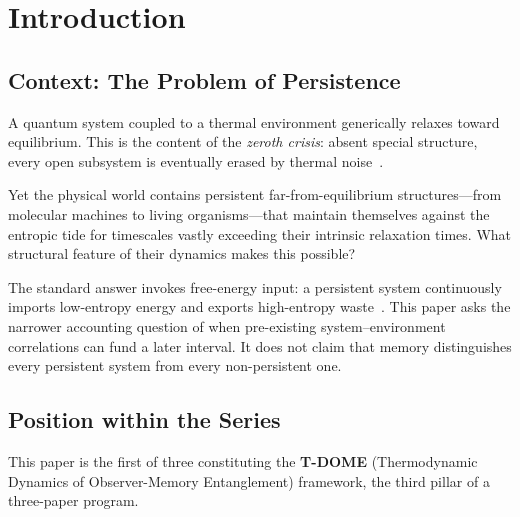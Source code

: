 \documentclass[12pt]{article}
\begin{document}
\section{Introduction}
\label{sec:intro}

\subsection{Context: The Problem of Persistence}

A quantum system coupled to a thermal environment generically
relaxes toward equilibrium. This is the content of the
\emph{zeroth crisis}: absent special structure, every open
subsystem is eventually erased by thermal noise~\cite{BreuerPetruccione2002}.

Yet the physical world contains persistent far-from-equilibrium
structures---from molecular machines to living organisms---that
maintain themselves against the entropic tide for timescales
vastly exceeding their intrinsic relaxation times. What
structural feature of their dynamics makes this possible?

The standard answer invokes free-energy input: a persistent system
continuously imports low-entropy energy and exports high-entropy
waste~\cite{Schrodinger1944}.  This paper asks the narrower accounting
question of when pre-existing system--environment correlations can fund
a later interval.  It does not claim that memory distinguishes every
persistent system from every non-persistent one.

\subsection{Position within the Series}

This paper is the first of three constituting the
\textbf{T-DOME} (Thermodynamic Dynamics of Observer-Memory
Entanglement) framework, the third pillar of a three-paper
program.
\end{document}
